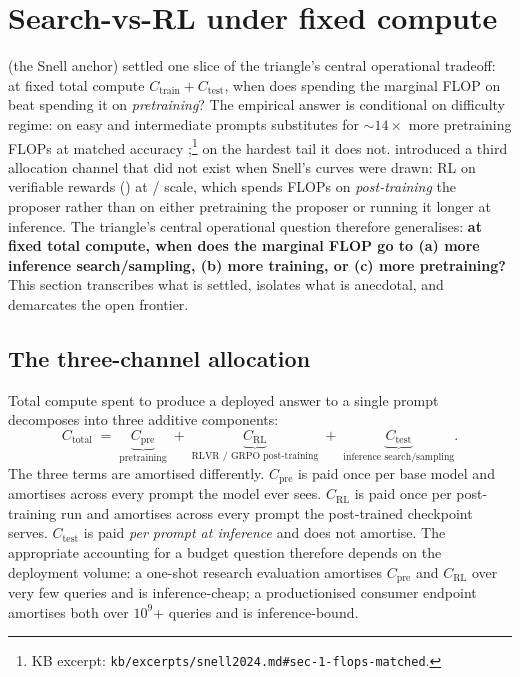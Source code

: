 
\section{Search-vs-RL under fixed compute}
\label{sec:search-vs-rl}

 (the Snell anchor) settled one
slice of the triangle's central operational tradeoff: at fixed total
compute $C_\text{train} + C_\text{test}$, when does spending the
marginal FLOP on  beat spending it on
\emph{pretraining}? The empirical answer is conditional on difficulty
regime: on easy and intermediate prompts  substitutes
for $\sim\!14\times$ more pretraining FLOPs at matched accuracy
\citep[\S 6]{snell2024};\footnote{KB excerpt:
\nolinkurl{kb/excerpts/snell2024.md#sec-1-flops-matched}.} on the hardest
tail it does not.  introduced a third
allocation channel that did not exist when Snell's curves were drawn:
RL on verifiable rewards () at / scale, which spends
FLOPs on \emph{post-training} the proposer rather than on either
pretraining the proposer or running it longer at inference. The
triangle's central operational question therefore generalises:
\textbf{at fixed total compute, when does the marginal FLOP go to
(a) more inference search/sampling, (b) more  training, or (c)
more pretraining?} This section transcribes what is settled, isolates
what is anecdotal, and demarcates the open frontier.

\subsection{The three-channel allocation}
\label{sec:svr-three-channels}

Total compute spent to produce a deployed answer to a single prompt
decomposes into three additive components:
\begin{equation}
  C_\text{total}
    \;=\; \underbrace{C_\text{pre}}_{\text{pretraining}}
    \;+\; \underbrace{C_\text{RL}}_{\text{RLVR / GRPO post-training}}
    \;+\; \underbrace{C_\text{test}}_{\text{inference search/sampling}}.
  \label{eq:three-channel}
\end{equation}
The three terms are amortised differently. $C_\text{pre}$ is paid once
per base model and amortises across every prompt the model ever sees.
$C_\text{RL}$ is paid once per post-training run and amortises across
every prompt the post-trained checkpoint serves. $C_\text{test}$ is
paid \emph{per prompt at inference} and does not amortise. The
appropriate accounting for a budget question therefore depends on the
deployment volume: a one-shot research evaluation amortises
$C_\text{pre}$ and $C_\text{RL}$ over very few queries and is
inference-cheap; a productionised consumer endpoint amortises both over
$10^9$+ queries and is inference-bound.

